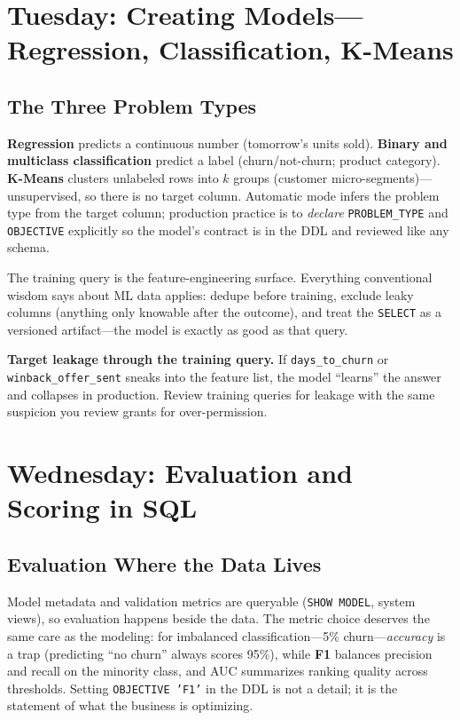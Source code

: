 \section{Tuesday: Creating Models---Regression, Classification, K-Means}
\subsection{The Three Problem Types}
\textbf{Regression} predicts a continuous number (tomorrow's units sold). \textbf{Binary and multiclass classification} predict a label (churn/not-churn; product category). \textbf{K-Means} clusters unlabeled rows into $k$ groups (customer micro-segments)---unsupervised, so there is no target column. Automatic mode infers the problem type from the target column; production practice is to \emph{declare} \texttt{PROBLEM\_TYPE} and \texttt{OBJECTIVE} explicitly so the model's contract is in the DDL and reviewed like any schema.

The training query is the feature-engineering surface. Everything conventional wisdom says about ML data applies: dedupe before training, exclude leaky columns (anything only knowable after the outcome), and treat the \texttt{SELECT} as a versioned artifact---the model is exactly as good as that query.

\begin{pitfall}
\textbf{Target leakage through the training query.} If \texttt{days\_to\_churn} or \texttt{winback\_offer\_sent} sneaks into the feature list, the model ``learns'' the answer and collapses in production. Review training queries for leakage with the same suspicion you review grants for over-permission.
\end{pitfall}

\section{Wednesday: Evaluation and Scoring in SQL}
\subsection{Evaluation Where the Data Lives}
Model metadata and validation metrics are queryable (\texttt{SHOW MODEL}, system views), so evaluation happens beside the data. The metric choice deserves the same care as the modeling: for imbalanced classification---5\% churn---\emph{accuracy} is a trap (predicting ``no churn'' always scores 95\%), while \textbf{F1} balances precision and recall on the minority class, and AUC summarizes ranking quality across thresholds. Setting \texttt{OBJECTIVE 'F1'} in the DDL is not a detail; it is the statement of what the business is optimizing.

